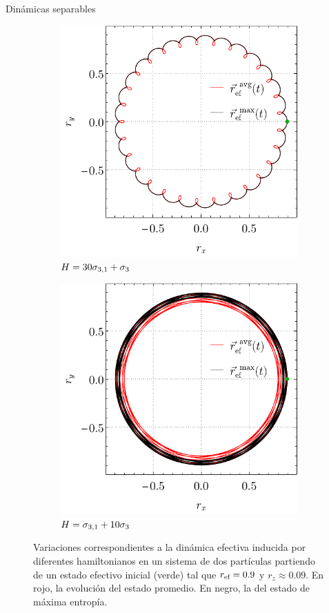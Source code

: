 \begin{frame}{Dinámicas separables}
    \begin{figure}[ht!]
        \centering
        \begin{subfigure}{0.5\textwidth}
          \centering
          \includegraphics[width=0.8\linewidth]{figures/avg_results/local_AvgVSMax_p2=0.1_r=0.9_w1=30_w2=1.pdf}
          \caption{$H=30\sigma_{3,1}+\sigma_{3}$}
        \end{subfigure}%
        \begin{subfigure}{0.5\textwidth}
          \centering
          \includegraphics[width=0.8\linewidth]{figures/avg_results/local_AvgVSMax_p2=0.1_r=0.9_w1=1_w2=10.pdf}
          \caption{$H=\sigma_{3,1}+10\sigma_{3}$}
        \end{subfigure}
        \caption{Variaciones correspondientes a la dinámica efectiva inducida por diferentes hamiltonianos en un sistema de dos partículas partiendo de un estado efectivo inicial (verde) tal que $r_{\text{ef}}=0.9$ y $r_{z}\approx0.09$. En rojo, la evolución del estado promedio. En negro, la del estado de máxima entropía. \label{ap:EffDunAVGvsMaxEnt2}}
    \end{figure}
\end{frame}

